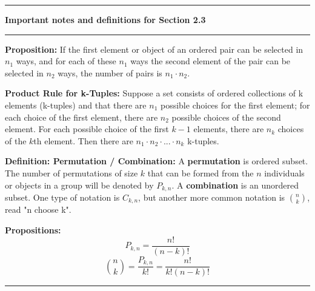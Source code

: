 \hrule \medskip
{\large \textbf{Important notes and definitions for Section 2.3}} \newline
\hrule 
\textbf{Proposition:} If the first element or object of an ordered pair can be selected in $n_1$ ways, and for each of these $n_1$ ways the second element of the pair can be selected in $n_2$ ways, the number of pairs is $n_1 \cdot n_2$.

\textbf{Product Rule for k-Tuples:} Suppose a set consists of ordered collections of k elements (k-tuples) and that
there are $n_1$ possible choices for the first element; for each choice of the first element, there are $n_2$ possible choices of the second element. For each possible choice of the first $k - 1$ elements, there are $n_k$ choices of the $k$th element. Then there are $n_1 \cdot n_2 \cdot ... \cdot n_k$ k-tuples. 

\textbf{Definition: Permutation / Combination:} A \textbf{permutation} is ordered subset. The number of permutations of size $k$ that can be formed from the $n$ individuals or objects in a group will be denoted by $P_{k,n}$. A \textbf{combination} is an unordered subset. One type of notation is $C_{k,n}$, but another more common notation is $\binom{n}{k}$, read "n choose k".

\textbf{Propositions:}
\[P_{k,n} = \frac{n!}{(n-k)!}\]
\[\binom{n}{k} = \frac{P_{k,n}}{k!} = \frac{n!}{k!(n - k)!}\]

\medskip \hrule 